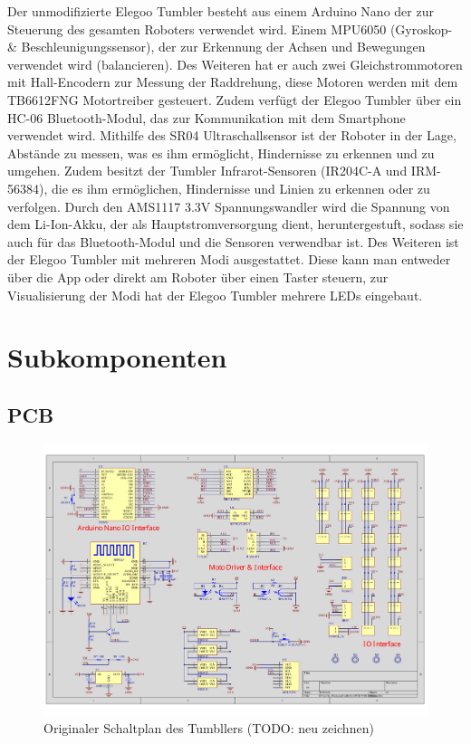 Der unmodifizierte Elegoo Tumbler besteht aus einem Arduino Nano der zur Steuerung des gesamten Roboters verwendet wird. 
Einem MPU6050 (Gyroskop- \& Beschleunigungssensor), der zur Erkennung der Achsen und Bewegungen verwendet wird (balancieren). 
Des Weiteren hat er auch zwei Gleichstrommotoren mit Hall-Encodern zur Messung der Raddrehung, diese Motoren werden mit dem TB6612FNG Motortreiber gesteuert. 
Zudem verfügt der Elegoo Tumbler über ein HC-06 Bluetooth-Modul, das zur Kommunikation mit dem Smartphone verwendet wird. Mithilfe des SR04 Ultraschallsensor ist der Roboter in der Lage, 
Abstände zu messen, was es ihm ermöglicht, Hindernisse zu erkennen und zu umgehen.  
Zudem besitzt der Tumbler Infrarot-Sensoren (IR204C-A und IRM-56384), die es ihm ermöglichen, Hindernisse und Linien zu erkennen oder zu verfolgen. 
Durch den AMS1117 3.3V Spannungswandler wird die Spannung von dem Li-Ion-Akku, der als Hauptstromversorgung dient, heruntergestuft, 
sodass sie auch für das Bluetooth-Modul und die Sensoren verwendbar ist. Des Weiteren ist der Elegoo Tumbler mit mehreren Modi ausgestattet. 
Diese kann man entweder über die App oder direkt am Roboter über einen Taster steuern, zur Visualisierung der Modi hat der Elegoo Tumbler mehrere LEDs eingebaut.
\section{Subkomponenten}
\label{subsec:subkomponenten}
%
\subsection{PCB}
%
\begin{figure}
    \includegraphics[width=\textwidth, center]{img/elegoo_tumbller_original_circuit.pdf}
    \caption{Originaler Schaltplan des Tumbllers (TODO: neu zeichnen)}
    \label{fig:elegoo_tumbller_original_circuit}
\end{figure}
%
